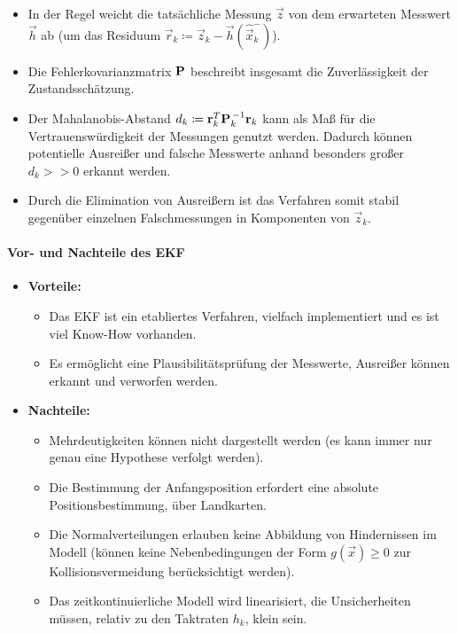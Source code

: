					\begin{itemize}
						\item In der Regel weicht die tatsächliche Messung \( \vec{z} \) von dem erwarteten Messwert \( \vec{h} \) ab (um das Residuum \( \vec{r}_k \coloneqq \vec{z}_k - \vec{h}(\hat{\vec{x}}_k^-) \)).
						\item Die Fehlerkovarianzmatrix \( \boldsymbol{\mathrm{P}} \) beschreibt insgesamt die Zuverlässigkeit der Zustandsschätzung.
						\item Der Mahalanobis-Abstand \( d_k \coloneqq \boldsymbol{\mathrm{r}}_k^T \boldsymbol{\mathrm{P}}_k^{\,-1} \boldsymbol{\mathrm{r}}_k \) kann als Maß für die Vertrauenswürdigkeit der Messungen genutzt werden. Dadurch können potentielle Ausreißer und falsche Messwerte anhand besonders großer \( d_k >> 0 \) erkannt werden.
						\item Durch die Elimination von Ausreißern ist das Verfahren somit stabil gegenüber einzelnen Falschmessungen in Komponenten von \( \vec{z}_k \).
					\end{itemize}
				
				\paragraph{Vor- und Nachteile des EKF}
					\begin{itemize}
						\item \textbf{Vorteile:}
							\begin{itemize}
								\item Das EKF ist ein etabliertes Verfahren, vielfach implementiert und es ist viel Know-How vorhanden.
								\item Es ermöglicht eine Plausibilitätsprüfung der Messwerte, \dh Ausreißer können erkannt und verworfen werden.
							\end{itemize}
						\item \textbf{Nachteile:}
							\begin{itemize}
								\item Mehrdeutigkeiten können nicht dargestellt werden (\dh es kann immer nur genau eine Hypothese verfolgt werden).
								\item Die Bestimmung der Anfangsposition erfordert eine absolute Positionsbestimmung, \zB über Landkarten.
								\item Die Normalverteilungen erlauben keine Abbildung von Hindernissen im Modell (\zB können keine Nebenbedingungen der Form \( g(\vec{x}) \geq 0 \) zur Kollisionsvermeidung berücksichtigt werden).
								\item Das zeitkontinuierliche Modell wird linearisiert, \dh die Unsicherheiten müssen, relativ zu den Taktraten \( h_k \), klein sein.
							\end{itemize}
					\end{itemize}

